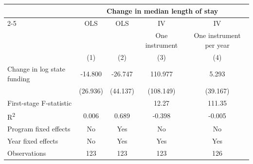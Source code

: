 \begin{table}[htbp]
\centering
\label{tab:iv_mlos_total}
\begin{tabular}{l*{4}{c}}
\toprule
 & \multicolumn{4}{c}{Change in median length of stay} \\
\cmidrule(lr){2-5}
 & OLS & OLS & IV & IV \\
 &  &  & One instrument & One instrument per year \\
 & (1) & (2) & (3) & (4) \\
\midrule
Change in log state funding & -14.800 & -26.747 & 110.977 & 5.293 \\
 & (26.936) & (44.137) & (108.149) & (39.167) \\
First-stage F-statistic &  &  & 12.27 & 111.35 \\
R\textsuperscript{2} & 0.006 & 0.689 & -0.398 & -0.005 \\
Program fixed effects & No & Yes & No & No \\
Year fixed effects & No & Yes & Yes & Yes \\
Observations & 123 & 123 & 123 & 126 \\
\bottomrule
\end{tabular}
\end{table}
